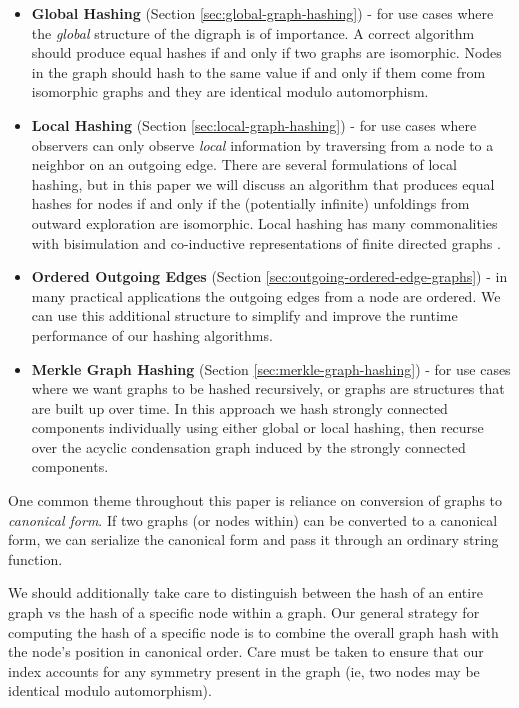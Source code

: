 \documentclass[twoside,leqno]{article}
\begin{document}
\begin{itemize}
  \item \textbf{Global Hashing} (Section \ref{sec:global-graph-hashing}) - for use cases where the \textit{global} structure of the digraph is of importance. A correct algorithm should produce equal hashes if and only if two graphs are isomorphic. Nodes in the graph should hash to the same value if and only if them come from isomorphic graphs and they are identical modulo automorphism.
  \item \textbf{Local Hashing} (Section \ref{sec:local-graph-hashing}) - for use cases where observers can only observe \textit{local} information by traversing from a node to a neighbor on an outgoing edge. There are several formulations of local hashing, but in this paper we will discuss an algorithm that produces equal hashes for nodes if and only if the (potentially infinite) unfoldings from outward exploration are isomorphic. Local hashing has many commonalities with bisimulation and co-inductive representations of finite directed graphs \cite{bisimulation_book,coinductive_graphs}.
  \item \textbf{Ordered Outgoing Edges} (Section \ref{sec:outgoing-ordered-edge-graphs}) - in many practical applications the outgoing edges from a node are ordered. We can use this additional structure to simplify and improve the runtime performance of our hashing algorithms.
  \item \textbf{Merkle Graph Hashing} (Section \ref{sec:merkle-graph-hashing}) - for use cases where we want graphs to be hashed recursively, or graphs are structures that are built up over time. In this approach we hash strongly connected components individually using either global or local hashing, then recurse over the acyclic condensation graph induced by the strongly connected components.
\end{itemize}

One common theme throughout this paper is reliance on conversion of graphs to \textit{canonical form}. If two graphs (or nodes within) can be converted to a canonical form, we can serialize the canonical form and pass it through an ordinary string function.

We should additionally take care to distinguish between the hash of an entire graph vs the hash of a specific node within a graph. Our general strategy for computing the hash of a specific node is to combine the overall graph hash with the node's position in canonical order. Care must be taken to ensure that our index accounts for any symmetry present in the graph (ie, two nodes may be identical modulo automorphism).
\end{document}
